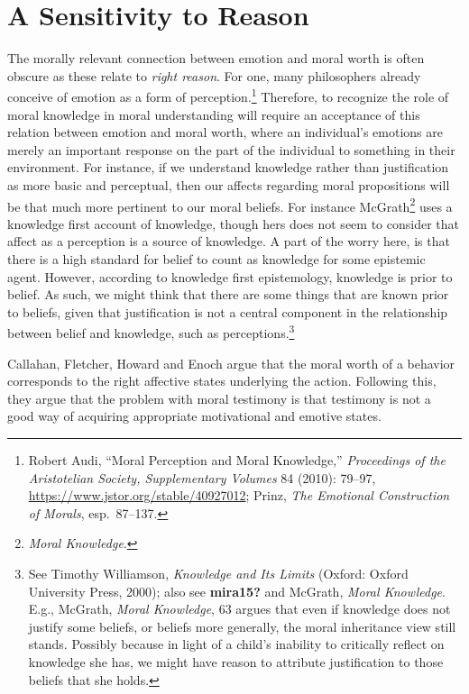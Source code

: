 \documentclass[
  12pt,
]{book}
\theoremstyle{definition}
\theoremstyle{definition}
\theoremstyle{definition}
\theoremstyle{definition}
\theoremstyle{remark}
\begin{document}
\section{A Sensitivity to Reason}\label{a-sensitivity-to-reason}

The morally relevant connection between emotion and moral worth is often obscure as these relate to \emph{right reason}. For one, many philosophers already conceive of emotion as a form of perception.\footnote{Robert Audi, {``Moral {Perception} and {Moral Knowledge},''} \emph{Proceedings of the Aristotelian Society, Supplementary Volumes} 84 (2010): 79--97, \url{https://www.jstor.org/stable/40927012}; Prinz, \emph{The {Emotional Construction} of {Morals}}, esp.~87--137.} Therefore, to recognize the role of moral knowledge in moral understanding will require an acceptance of this relation between emotion and moral worth, where an individual's emotions are merely an important response on the part of the individual to something in their environment. For instance, if we understand knowledge rather than justification as more basic and perceptual, then our affects regarding moral propositions will be that much more pertinent to our moral beliefs. For instance McGrath\footnote{\emph{Moral {Knowledge}}.} uses a knowledge first account of knowledge, though hers does not seem to consider that affect as a perception is a source of knowledge. A part of the worry here, is that there is a high standard for belief to count as knowledge for some epistemic agent. However, according to knowledge first epistemology, knowledge is prior to belief. As such, we might think that there are some things that are known prior to beliefs, given that justification is not a central component in the relationship between belief and knowledge, such as perceptions.\footnote{See Timothy Williamson, \emph{Knowledge and {Its Limits}} (Oxford: Oxford University Press, 2000); also see \textbf{mira15?} and McGrath, \emph{Moral {Knowledge}}. E.g., McGrath, \emph{Moral {Knowledge}}, 63 argues that even if knowledge does not justify some beliefs, or beliefs more generally, the moral inheritance view still stands. Possibly because in light of a child's inability to critically reflect on knowledge she has, we might have reason to attribute justification to those beliefs that she holds.}

Callahan, Fletcher, Howard and Enoch argue that the moral worth of a behavior corresponds to the right affective states underlying the action. Following this, they argue that the problem with moral testimony is that testimony is not a good way of acquiring appropriate motivational and emotive states.
\end{document}
